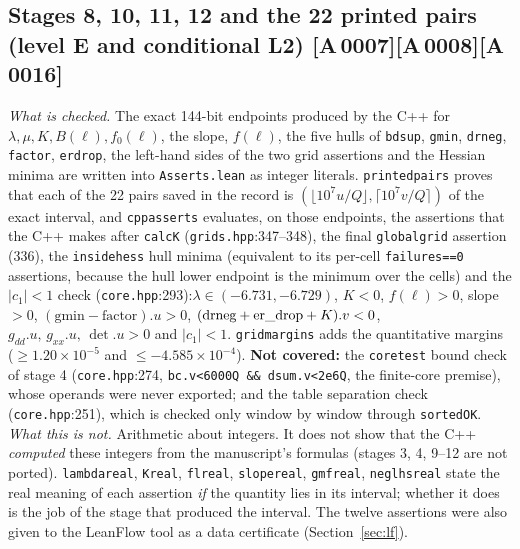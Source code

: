 \documentclass[10pt]{article}
\newcommand{\tg}[2]{\texorpdfstring{\textsf{[#1\,#2]}}{}}  %
\newcommand{\lean}[1]{\texttt{#1}}
\renewcommand{\_}{\textunderscore\allowbreak}
\begin{document}
\subsection{Stages 8, 10, 11, 12 and the 22 printed pairs (level E and conditional L2) \tg{A}{0007}\tg{A}{0008}\tg{A}{0016}}
\emph{What is checked.} The exact 144-bit endpoints produced by the C++ for $\lambda,\mu,K,B(\ell),f_0(\ell)$, the slope, $f(\ell)$, the five hulls of \lean{bdsup}, \lean{gmin}, \lean{drneg}, \lean{factor}, \lean{er\_drop}, the left-hand sides of the two grid assertions and the Hessian minima are written into \texttt{Asserts.lean} as integer literals. \lean{printed\_pairs} proves that each of the 22 pairs saved in the record is $(\lfloor10^7u/Q\rfloor,\lceil10^7v/Q\rceil)$ of the exact interval, and \lean{cpp\_asserts} evaluates, on those endpoints, the assertions that the C++ makes after \lean{calcK} (\texttt{grids.hpp}:347--348), the final \lean{global\_grid} assertion (336), the \lean{inside\_hess} hull minima (equivalent to its per-cell \texttt{failures==0} assertions, because the hull lower endpoint is the minimum over the cells) and the $|c_1|<1$ check (\texttt{core.hpp}:293):$\lambda\in(-6.731,-6.729)$, $K<0$, $f(\ell)>0$, slope $>0$, $(\text{gmin}-\text{factor}).u>0$, $(\text{drneg}+\text{er\_drop}+K).v<0$, $g_{dd}.u,\,g_{xx}.u,\,\det.u>0$ and $|c_1|<1$. \lean{grid\_margins} adds the quantitative margins ($\ge1.20\times10^{-5}$ and $\le-4.585\times10^{-4}$). \textbf{Not covered:} the \lean{core\_test} bound check of stage 4 (\texttt{core.hpp}:274, \texttt{bc.v<6000Q \&\& dsum.v<2e6Q}, the finite-core premise), whose operands were never exported; and the table separation check (\texttt{core.hpp}:251), which is checked only window by window through \lean{sortedOK}.
\emph{What this is not.} Arithmetic about integers. It does not show that the C++ \emph{computed} these integers from the manuscript's formulas (stages 3, 4, 9--12 are not ported). \lean{lambda\_real}, \lean{K\_real}, \lean{fl\_real}, \lean{slope\_real}, \lean{gmf\_real}, \lean{neglhs\_real} state the real meaning of each assertion \emph{if} the quantity lies in its interval; whether it does is the job of the stage that produced the interval.
The twelve assertions were also given to the LeanFlow tool as a data certificate (Section~\ref{sec:lf}).
\end{document}
